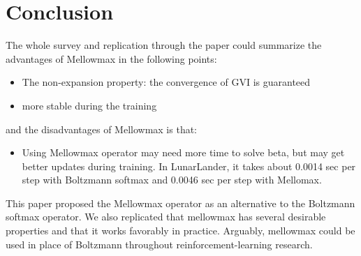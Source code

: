 \section{Conclusion}
\label{section:conclusion}
The whole survey and replication through the paper could summarize the advantages of Mellowmax in the following points:
\begin{itemize}
\item The non-expansion property: the convergence of GVI is guaranteed
\item more stable during the training
\end{itemize}
and the disadvantages of Mellowmax is that:
\begin{itemize}
\item Using Mellowmax operator may need more time to solve beta, but may get better updates during training.
In LunarLander, it takes about 0.0014 sec per step with Boltzmann softmax and 0.0046 sec per step with Mellomax.
\end{itemize}
This paper proposed the Mellowmax operator as an alternative to the Boltzmann softmax operator. We also replicated that mellowmax has several desirable properties and that it works favorably in practice. Arguably, mellowmax could be used in place of Boltzmann throughout reinforcement-learning research.


